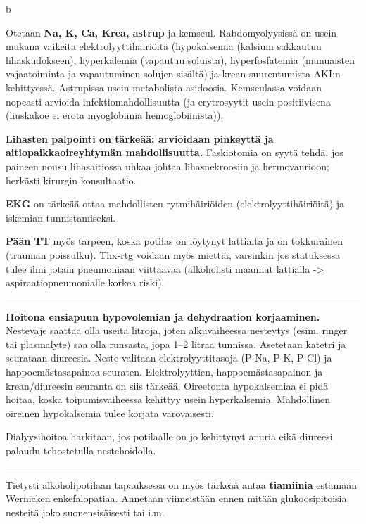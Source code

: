 \documentclass[
]{book}
\begin{document}
b

Otetaan \textbf{Na, K, Ca, Krea, astrup} ja kemseul. Rabdomyolyysissä on usein mukana vaikeita elektrolyyttihäiriöitä (hypokalsemia (kalsium sakkautuu lihaskudokseen), hyperkalemia (vapautuu soluista), hyperfosfatemia (munuaisten vajaatoiminta ja vapautuminen solujen sisältä) ja krean suurentumista AKI:n kehittyessä. Astrupissa usein metabolista asidoosia. Kemseulassa voidaan nopeasti arvioida infektiomahdollisuutta (ja erytrosyytit usein positiivisena (liuskakoe ei erota myoglobiinia hemoglobiinista)).

\textbf{Lihasten palpointi on tärkeää; arvioidaan pinkeyttä ja aitiopaikkaoireyhtymän mahdollisuutta.} Faskiotomia on syytä tehdä, jos paineen nousu lihasaitiossa uhkaa johtaa lihasnekroosiin ja hermovaurioon; herkästi kirurgin konsultaatio.

\textbf{EKG} on tärkeää ottaa mahdollisten rytmihäiriöiden (elektrolyyttihäiriöitä) ja iskemian tunnistamiseksi.

\textbf{Pään TT} myös tarpeen, koska potilas on löytynyt lattialta ja on tokkurainen (trauman poissulku). Thx-rtg voidaan myös miettiä, varsinkin jos statuksessa tulee ilmi jotain pneumoniaan viittaavaa (alkoholisti maannut lattialla -\textgreater{} aspiraatiopneumonialle korkea riski).

\begin{center}\rule{0.5\linewidth}{0.5pt}\end{center}

\textbf{Hoitona ensiapuun hypovolemian ja dehydraation korjaaminen.} Nestevaje saattaa olla useita litroja, joten alkuvaiheessa nesteytys (esim. ringer tai plasmalyte) saa olla runsasta, jopa 1--2 litraa tunnissa. Asetetaan katetri ja seurataan diureesia. Neste valitaan elektrolyyttitasoja (P-Na, P-K, P-Cl) ja happoemästasapainoa seuraten. Elektrolyyttien, happoemästasapainon ja krean/diureesin seuranta on siis tärkeää. Oireetonta hypokalsemiaa ei pidä hoitaa, koska toipumisvaiheessa kehittyy usein hyperkalsemia. Mahdollinen oireinen hypokalsemia tulee korjata varovaisesti.

Dialyysihoitoa harkitaan, jos potilaalle on jo kehittynyt anuria eikä diureesi palaudu tehostetulla nestehoidolla.

\begin{center}\rule{0.5\linewidth}{0.5pt}\end{center}

Tietysti alkoholipotilaan tapauksessa on myös tärkeää antaa \textbf{tiamiinia} estämään Wernicken enkefalopatiaa. Annetaan viimeistään ennen mitään glukoosipitoisia nesteitä joko suonensisäisesti tai i.m.
\end{document}
